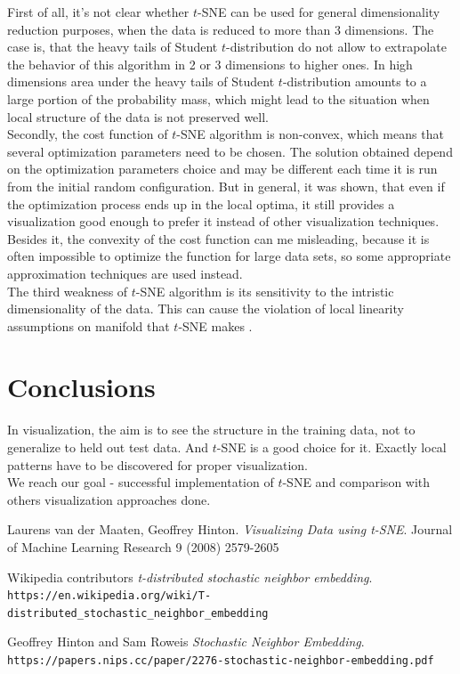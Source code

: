 First of all, it's not clear whether $t$-SNE can be used for general dimensionality reduction purposes, when the data is reduced to more than 3 dimensions. The case is, that the heavy tails of Student $t$-distribution do not allow to extrapolate the behavior of this algorithm in 2 or 3 dimensions to higher ones. In high dimensions area under the heavy tails of Student $t$-distribution amounts to a large portion of the probability mass, which might lead to the situation when local structure of the data is not preserved well. \\

Secondly, the cost function of $t$-SNE algorithm is non-convex, which means that several optimization parameters need to be chosen. The solution obtained depend on the optimization parameters choice and may be different each time it is run from the initial random configuration. But in general, it was shown, that even if the optimization process ends up in the local optima, it still provides a visualization good enough to prefer it instead of other visualization techniques. Besides it, the convexity of the cost function can me misleading, because it is often impossible to optimize the function for large data sets, so some appropriate approximation techniques are used instead. \\

The third weakness of $t$-SNE algorithm is its sensitivity to the intristic dimensionality of the data. This can cause the violation of local linearity assumptions on manifold that $t$-SNE makes \cite{tsnearticle}.\\

\section{Conclusions}

In visualization, the aim is to see the structure in the training
data, not to generalize to held out test data. And $t$-SNE is a good choice for it. Exactly local patterns have to be discovered for proper visualization.\\
We reach our goal - successful implementation of $t$-SNE and comparison with others visualization approaches done.

\begin{thebibliography}{4}
	Laurens van der Maaten, Geoffrey Hinton.
	\textit{Visualizing Data using t-SNE}. 
	Journal of Machine Learning Research 9 (2008) 2579-2605
	
	Wikipedia contributors
	\textit{t-distributed stochastic neighbor embedding}. 
	\\\texttt{https://en.wikipedia.org/wiki/T-distributed\_stochastic\_neighbor\_embedding}
	
	Geoffrey Hinton and Sam Roweis
	\textit{Stochastic Neighbor Embedding}.
	\texttt{https://papers.nips.cc/paper/2276-stochastic-neighbor-embedding.pdf}
	
	
\end{thebibliography}



